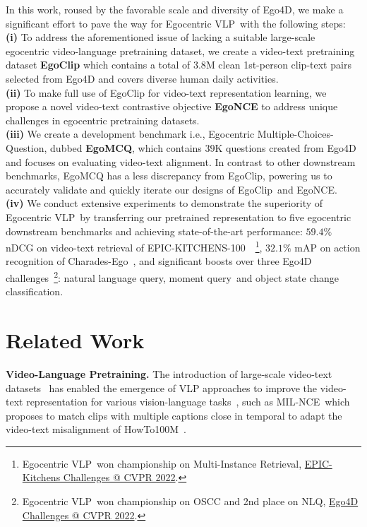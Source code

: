 \documentclass{article}
\newcommand{\vlp}{Egocentric VLP}
\newcommand{\dataset}{EgoClip}
\newcommand{\model}{EgoNCE\xspace}
\newcommand{\eval}{EgoMCQ}
\newcommand{\epic}{EPIC-KITCHENS-100}
\newcommand{\howto}{HowTo100M}
\begin{document}
In this work, roused by the favorable scale and diversity of Ego4D, we make a significant effort to pave the way for \vlp~with the following steps:\\
\textbf{(i)} To address the aforementioned issue of lacking a suitable large-scale egocentric video-language pretraining dataset, we create a video-text pretraining dataset \textbf{\dataset} which contains a total of $3.8$M clean 1st-person clip-text pairs selected from Ego4D and covers diverse human daily activities.\\
\textbf{(ii)} To make full use of {\dataset} for video-text representation learning, we propose a novel video-text contrastive objective \textbf{\model} to address unique challenges in egocentric pretraining datasets.\\
\textbf{(iii)} We create a development benchmark i.e., Egocentric Multiple-Choices-Question, dubbed \textbf{\eval}, which contains $39$K questions created from Ego4D and focuses on evaluating video-text alignment. In contrast to other downstream benchmarks, {\eval} has a less discrepancy from \dataset, powering us to accurately validate and quickly iterate our designs of \dataset~and \model.\\
\textbf{(iv)} We conduct extensive experiments to demonstrate the superiority of \vlp~by transferring our pretrained representation to five egocentric downstream benchmarks and achieving state-of-the-art performance: $59.4\%$ nDCG on video-text retrieval of \epic~\cite{kazakos2019epic}~\footnote{\footnotesize \vlp~won championship on Multi-Instance Retrieval, \href{https://epic-kitchens.github.io/2022}{EPIC-Kitchens Challenges @ CVPR 2022}.}, $32.1\%$ mAP on action recognition of Charades-Ego~\cite{sigurdsson2018charades}, and significant boosts over three Ego4D challenges~\footnote{\footnotesize \vlp~won championship on OSCC and 2nd place on NLQ, \href{https://ego4d-data.org/workshops/cvpr22/}{Ego4D Challenges @ CVPR 2022}.}: natural language query, moment query~and object state change classification. \section{Related Work}
\noindent\textbf{Video-Language Pretraining.}\label{relatedwork_vlp}
The introduction of large-scale video-text datasets~\cite{miech2019howto100m,bain2021frozen} has enabled the emergence of VLP approaches to improve the video-text representation for various vision-language tasks~\cite{anne2017localizing, chen2017sca, msrvttqamsvdqa}, such as MIL-NCE~which \cite{miech2020end} proposes to match clips with multiple captions close in temporal to adapt the video-text misalignment of \howto~\cite{miech2019howto100m}.
\end{document}
